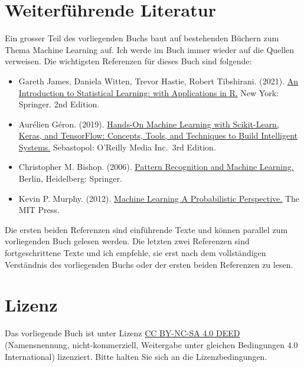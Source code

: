 \documentclass[
]{book}
\providecommand{\tightlist}{%
  \setlength{\itemsep}{0pt}\setlength{\parskip}{0pt}}
\begin{document}
\hypertarget{weiterfuxfchrende-literatur}{%
\section*{Weiterführende Literatur}\label{weiterfuxfchrende-literatur}}

Ein grosser Teil des vorliegenden Buchs baut auf bestehenden Büchern zum Thema Machine Learning auf. Ich werde im Buch immer wieder auf die Quellen verweisen. Die wichtigsten Referenzen für dieses Buch sind folgende:

\begin{itemize}
\tightlist
\item
  Gareth James, Daniela Witten, Trevor Hastie, Robert Tibshirani. (2021). \href{https://www.statlearning.com/}{An Introduction to Statistical Learning: with Applications in R.} New York: Springer. 2nd Edition.
\item
  Aurélien Géron. (2019). \href{https://www.oreilly.com/library/view/hands-on-machine-learning/9781098125967/}{Hands-On Machine Learning with Scikit-Learn, Keras, and TensorFlow: Concepts, Tools, and Techniques to Build Intelligent Systems.} Sebastopol: O'Reilly Media Inc.~3rd Edition.
\item
  Christopher M. Bishop. (2006). \href{https://link.springer.com/book/9780387310732}{Pattern Recognition and Machine Learning.} Berlin, Heidelberg: Springer.
\item
  Kevin P. Murphy. (2012). \href{https://mitpress.mit.edu/9780262018029/machine-learning/}{Machine Learning A Probabilistic Perspective.} The MIT Press.
\end{itemize}

Die ersten beiden Referenzen sind einführende Texte und können parallel zum vorliegenden Buch gelesen werden. Die letzten zwei Referenzen sind fortgeschrittene Texte und ich empfehle, sie erst nach dem vollständigen Verständnis des vorliegenden Buchs oder der ersten beiden Referenzen zu lesen.

\hypertarget{lizenz}{%
\section*{Lizenz}\label{lizenz}}

Das vorliegende Buch ist unter Lizenz \href{https://creativecommons.org/licenses/by-nc-sa/4.0/deed.de}{CC BY-NC-SA 4.0 DEED} (Namensnennung, nicht-kommerziell, Weitergabe unter gleichen Bedingungen 4.0 International) lizenziert. Bitte halten Sie sich an die Lizenzbedingungen.
\end{document}
